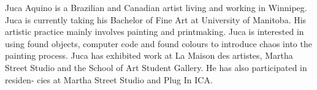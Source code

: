 Juca Aquino is a Brazilian and Canadian artist living and working in Winnipeg.
Juca is currently taking his Bachelor of Fine Art at University of Manitoba.
His artistic practice mainly involves painting and printmaking. Juca is
interested in using found objects, computer code and found colours to introduce
chaos into the painting process. Juca has exhibited work at La Maison des
artistes, Martha Street Studio and the School of Art Student Gallery. He has
also participated in residen- cies at Martha Street Studio and Plug In ICA.
